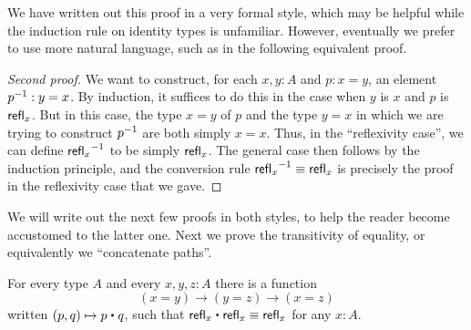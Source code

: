 We have written out this proof in a very formal style, which may be helpful while the induction rule on identity types is unfamiliar.
However, eventually we prefer to use more natural language, such as in the following equivalent proof.

\begin{proof}[Second proof]
  We want to construct, for each $x,y:A$ and $p:x=y$, an element $\mathord{{p}^{-1}}:y=x$.
  By induction, it suffices to do this in the case when $y$ is $x$ and $p$ is $\mathsf{refl}_{x}$.
  But in this case, the type $x=y$ of $p$ and the type $y=x$ in which we are trying to construct $\mathord{{p}^{-1}}$ are both simply $x=x$.
  Thus, in the ``reflexivity case'', we can define $\mathord{{\mathsf{refl}_{x}}^{-1}}$ to be simply $\mathsf{refl}_{x}$.
  The general case then follows by the induction principle, and the conversion rule $\mathord{{\mathsf{refl}_{x}}^{-1}}\equiv\mathsf{refl}_{x}$ is precisely the proof in the reflexivity case that we gave.
\end{proof}

We will write out the next few proofs in both styles, to help the reader become accustomed to the latter one.
Next we prove the transitivity of equality, or equivalently we ``concatenate paths''.

\begin{lem}\label{lem:concat}
  For every type $A$ and every $x,y,z:A$ there is a function
  \begin{equation*}
    (x= y) \to (y= z)\to (x=  z)
  \end{equation*}
  written $(p,q)\mapsto p\ct q$, such that $\refl{x}\ct \refl{x}\jdeq \refl{x}$ for any $x:A$.
\end{lem}

